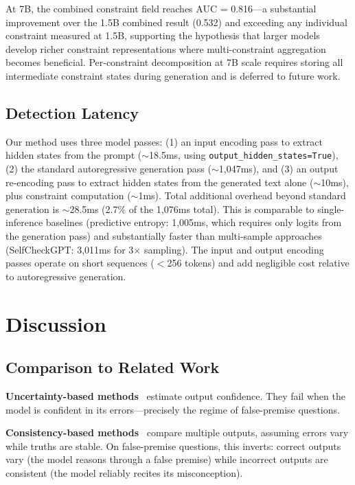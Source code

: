 \documentclass[11pt]{article}
\begin{document}
At 7B, the combined constraint field reaches AUC = 0.816---a substantial improvement over the 1.5B combined result (0.532) and exceeding any individual constraint measured at 1.5B, supporting the hypothesis that larger models develop richer constraint representations where multi-constraint aggregation becomes beneficial. Per-constraint decomposition at 7B scale requires storing all intermediate constraint states during generation and is deferred to future work.

\subsection{Detection Latency}
\label{sec:latency}

Our method uses three model passes: (1) an input encoding pass to extract hidden states from the prompt ($\sim$18.5ms, using \texttt{output\_hidden\_states=True}), (2) the standard autoregressive generation pass ($\sim$1,047ms), and (3) an output re-encoding pass to extract hidden states from the generated text alone ($\sim$10ms), plus constraint computation ($\sim$1ms). Total additional overhead beyond standard generation is $\sim$28.5ms (2.7\% of the 1,076ms total). This is comparable to single-inference baselines (predictive entropy: 1,005ms, which requires only logits from the generation pass) and substantially faster than multi-sample approaches (SelfCheckGPT: 3,011ms for 3$\times$ sampling). The input and output encoding passes operate on short sequences ($<$256 tokens) and add negligible cost relative to autoregressive generation.

\section{Discussion}

\subsection{Comparison to Related Work}

\textbf{Uncertainty-based methods}~\cite{kadavath2022language,kuhn2023semantic} estimate output confidence. They fail when the model is confident in its errors---precisely the regime of false-premise questions.

\textbf{Consistency-based methods}~\cite{manakul2023selfcheckgpt} compare multiple outputs, assuming errors vary while truths are stable. On false-premise questions, this inverts: correct outputs vary (the model reasons through a false premise) while incorrect outputs are consistent (the model reliably recites its misconception).
\end{document}
